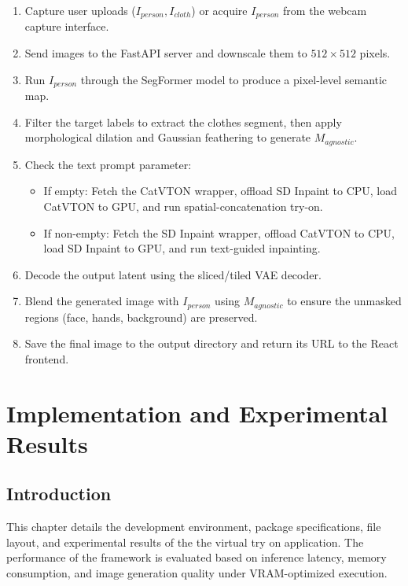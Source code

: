 \documentclass[12pt, a4paper]{report}
\begin{document}
\begin{enumerate}
\item Capture user uploads ($I_{person}, I_{cloth}$) or acquire $I_{person}$ from the webcam capture interface.
\item Send images to the FastAPI server and downscale them to $512 \times 512$ pixels.
\item Run $I_{person}$ through the SegFormer model to produce a pixel-level semantic map.
\item Filter the target labels to extract the clothes segment, then apply morphological dilation and Gaussian feathering to generate $M_{agnostic}$.
\item Check the text prompt parameter:
\begin{itemize}
\item If empty: Fetch the CatVTON wrapper, offload SD Inpaint to CPU, load CatVTON to GPU, and run spatial-concatenation try-on.
\item If non-empty: Fetch the SD Inpaint wrapper, offload CatVTON to CPU, load SD Inpaint to GPU, and run text-guided inpainting.
\end{itemize}
\item Decode the output latent using the sliced/tiled VAE decoder.
\item Blend the generated image with $I_{person}$ using $M_{agnostic}$ to ensure the unmasked regions (face, hands, background) are preserved.
\item Save the final image to the output directory and return its URL to the React frontend.
\end{enumerate}

\chapter{Implementation and Experimental Results}

\section{Introduction}

This chapter details the development environment, package specifications, file layout, and experimental results of the the virtual try on application. The performance of the framework is evaluated based on inference latency, memory consumption, and image generation quality under VRAM-optimized execution.
\end{document}
